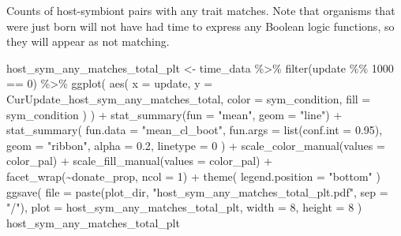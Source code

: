 \documentclass[
]{book}
\newenvironment{Shaded}{\begin{snugshade}}{\end{snugshade}}
\newcommand{\AttributeTok}[1]{\textcolor[rgb]{0.77,0.63,0.00}{#1}}
\newcommand{\DecValTok}[1]{\textcolor[rgb]{0.00,0.00,0.81}{#1}}
\newcommand{\FloatTok}[1]{\textcolor[rgb]{0.00,0.00,0.81}{#1}}
\newcommand{\FunctionTok}[1]{\textcolor[rgb]{0.00,0.00,0.00}{#1}}
\newcommand{\NormalTok}[1]{#1}
\newcommand{\OtherTok}[1]{\textcolor[rgb]{0.56,0.35,0.01}{#1}}
\newcommand{\SpecialCharTok}[1]{\textcolor[rgb]{0.00,0.00,0.00}{#1}}
\newcommand{\StringTok}[1]{\textcolor[rgb]{0.31,0.60,0.02}{#1}}
\begin{document}
Counts of host-symbiont pairs with any trait matches.
Note that organisms that were just born will not have had time to express any
Boolean logic functions, so they will appear as not matching.

\begin{Shaded}
\begin{Highlighting}[]
\NormalTok{host\_sym\_any\_matches\_total\_plt }\OtherTok{\textless{}{-}}\NormalTok{ time\_data }\SpecialCharTok{\%\textgreater{}\%}
  \FunctionTok{filter}\NormalTok{(update }\SpecialCharTok{\%\%} \DecValTok{1000} \SpecialCharTok{==} \DecValTok{0}\NormalTok{) }\SpecialCharTok{\%\textgreater{}\%}
  \FunctionTok{ggplot}\NormalTok{(}
    \FunctionTok{aes}\NormalTok{(}
      \AttributeTok{x =}\NormalTok{ update,}
      \AttributeTok{y =}\NormalTok{ CurUpdate\_host\_sym\_any\_matches\_total,}
      \AttributeTok{color =}\NormalTok{ sym\_condition,}
      \AttributeTok{fill =}\NormalTok{ sym\_condition}
\NormalTok{    )}
\NormalTok{  ) }\SpecialCharTok{+}
  \FunctionTok{stat\_summary}\NormalTok{(}\AttributeTok{fun =} \StringTok{"mean"}\NormalTok{, }\AttributeTok{geom =} \StringTok{"line"}\NormalTok{) }\SpecialCharTok{+}
  \FunctionTok{stat\_summary}\NormalTok{(}
    \AttributeTok{fun.data =} \StringTok{"mean\_cl\_boot"}\NormalTok{,}
    \AttributeTok{fun.args =} \FunctionTok{list}\NormalTok{(}\AttributeTok{conf.int =} \FloatTok{0.95}\NormalTok{),}
    \AttributeTok{geom =} \StringTok{"ribbon"}\NormalTok{,}
    \AttributeTok{alpha =} \FloatTok{0.2}\NormalTok{,}
    \AttributeTok{linetype =} \DecValTok{0}
\NormalTok{  ) }\SpecialCharTok{+}
  \FunctionTok{scale\_color\_manual}\NormalTok{(}\AttributeTok{values =}\NormalTok{ color\_pal) }\SpecialCharTok{+}
  \FunctionTok{scale\_fill\_manual}\NormalTok{(}\AttributeTok{values =}\NormalTok{ color\_pal) }\SpecialCharTok{+}
  \FunctionTok{facet\_wrap}\NormalTok{(}\SpecialCharTok{\textasciitilde{}}\NormalTok{donate\_prop, }\AttributeTok{ncol =} \DecValTok{1}\NormalTok{) }\SpecialCharTok{+}
  \FunctionTok{theme}\NormalTok{(}
    \AttributeTok{legend.position =} \StringTok{"bottom"}
\NormalTok{  )}
\FunctionTok{ggsave}\NormalTok{(}
  \AttributeTok{file =} \FunctionTok{paste}\NormalTok{(plot\_dir, }\StringTok{"host\_sym\_any\_matches\_total\_plt.pdf"}\NormalTok{, }\AttributeTok{sep =} \StringTok{"/"}\NormalTok{),}
  \AttributeTok{plot =}\NormalTok{ host\_sym\_any\_matches\_total\_plt,}
  \AttributeTok{width =} \DecValTok{8}\NormalTok{,}
  \AttributeTok{height =} \DecValTok{8}
\NormalTok{)}
\NormalTok{host\_sym\_any\_matches\_total\_plt}
\end{Highlighting}
\end{Shaded}
\end{document}
